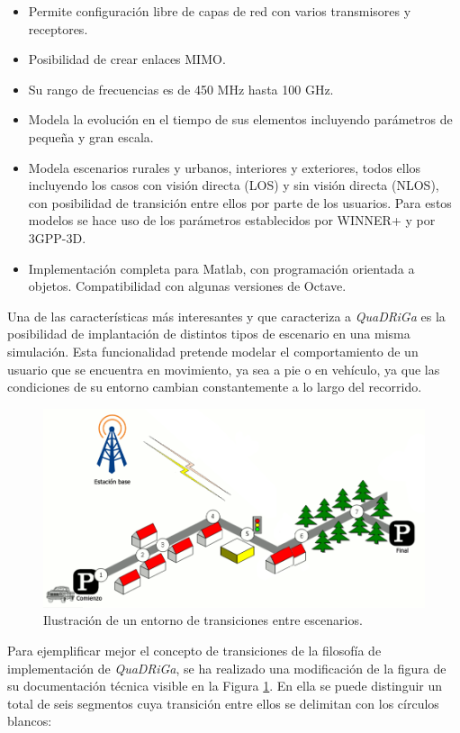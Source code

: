 \begin{itemize}
    \item Permite configuración libre de capas de red con varios transmisores y receptores.
    \item Posibilidad de crear enlaces MIMO.
    \item Su rango de frecuencias es de 450 MHz hasta 100 GHz.
    \item Modela la evolución en el tiempo de sus elementos incluyendo parámetros de pequeña y gran escala.
    \item Modela escenarios rurales y urbanos, interiores y exteriores, todos ellos incluyendo los casos con visión directa (LOS) y sin visión directa (NLOS), con posibilidad de transición entre ellos por parte de los usuarios. Para estos modelos se hace uso de los parámetros establecidos por WINNER+ y por 3GPP-3D.
    \item Implementación completa para Matlab, con programación orientada a objetos. Compatibilidad con algunas versiones de Octave.
\end{itemize}

Una de las características más interesantes y que caracteriza a \textit{QuaDRiGa} es la posibilidad de implantación de distintos tipos de escenario en una misma simulación. Esta funcionalidad pretende modelar el comportamiento de un usuario que se encuentra en movimiento, ya sea a pie o en vehículo, ya que las condiciones de su entorno cambian constantemente a lo largo del recorrido.

\begin{figure}[h!]
	\centering
    \includegraphics[width=\linewidth]{imagenes/transiciones.png}
	\caption{Ilustración de un entorno de transiciones entre escenarios.}
	\label{fig:transicion}
\end{figure}

Para ejemplificar mejor el concepto de transiciones de la filosofía de implementación de \textit{QuaDRiGa}, se ha realizado una modificación de la figura de su documentación técnica \cite{quadrigadoc} visible en la Figura \ref{fig:transicion}. En ella se puede distinguir un total de seis segmentos cuya transición entre ellos se delimitan con los círculos blancos:

